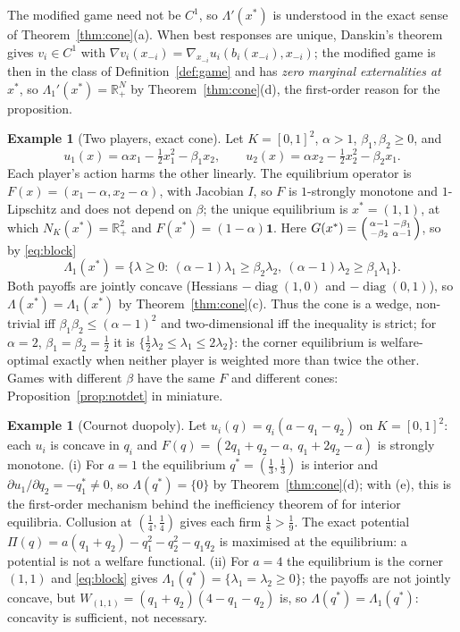 \documentclass[11pt,a4paper]{article}
\theoremstyle{plain}
\theoremstyle{definition}
\newtheorem{example}[theorem]{Example}
\theoremstyle{remark}
\newcommand{\R}{\mathbb{R}}
\newcommand{\NC}{N}
\newcommand{\Lam}{\Lambda}
\newcommand{\Lone}{\Lambda_{1}}
\begin{document}
The modified game need not be $C^1$, so $\Lam'(x^*)$ is understood in the exact sense of Theorem~\ref{thm:cone}(a). When best responses are unique, Danskin's theorem~\citep{danskin1966} gives $v_i\in C^1$ with $\nabla v_i(x_{-i})=\nabla_{x_{-i}}u_i(b_i(x_{-i}),x_{-i})$; the modified game is then in the class of Definition~\ref{def:game} and has \emph{zero marginal externalities at $x^*$}, so $\Lone'(x^*)=\R^N_+$ by Theorem~\ref{thm:cone}(d), the first-order reason for the proposition.

\begin{example}[Two players, exact cone]\label{ex:wedge}
Let $K=[0,1]^2$, $\alpha>1$, $\beta_1,\beta_2\ge 0$, and
\[
u_1(x)=\alpha x_1-\tfrac12x_1^2-\beta_1x_2,\qquad u_2(x)=\alpha x_2-\tfrac12x_2^2-\beta_2x_1 .
\]
Each player's action harms the other linearly. The equilibrium operator is $F(x)=(x_1-\alpha,x_2-\alpha)$, with Jacobian $I$, so $F$ is $1$-strongly monotone and $1$-Lipschitz and does not depend on $\beta$; the unique equilibrium is $x^*=(1,1)$, at which $\NC_K(x^*)=\R^2_+$ and $F(x^*)=(1-\alpha)\mathbf 1$. Here $G(x^*)=\begin{psmallmatrix}\alpha-1&-\beta_1\\-\beta_2&\alpha-1\end{psmallmatrix}$, so by \eqref{eq:block}
\[
\Lone(x^*)=\{\lambda\ge 0:\ (\alpha-1)\lambda_1\ge\beta_2\lambda_2,\ (\alpha-1)\lambda_2\ge\beta_1\lambda_1\}.
\]
Both payoffs are jointly concave (Hessians $-\operatorname{diag}(1,0)$ and $-\operatorname{diag}(0,1)$), so $\Lam(x^*)=\Lone(x^*)$ by Theorem~\ref{thm:cone}(c). Thus the cone is a wedge, non-trivial iff $\beta_1\beta_2\le(\alpha-1)^2$ and two-dimensional iff the inequality is strict; for $\alpha=2$, $\beta_1=\beta_2=\tfrac12$ it is $\{\tfrac12\lambda_2\le\lambda_1\le2\lambda_2\}$: the corner equilibrium is welfare-optimal exactly when neither player is weighted more than twice the other. Games with different $\beta$ have the same $F$ and different cones: Proposition~\ref{prop:notdet} in miniature.
\end{example}

\begin{example}[Cournot duopoly]\label{ex:cournot}
Let $u_i(q)=q_i(a-q_1-q_2)$ on $K=[0,1]^2$: each $u_i$ is concave in $q_i$ and $F(q)=(2q_1+q_2-a,\ q_1+2q_2-a)$ is strongly monotone. (i) For $a=1$ the equilibrium $q^*=(\tfrac13,\tfrac13)$ is interior and $\partial u_1/\partial q_2=-q_1^*\ne0$, so $\Lam(q^*)=\{0\}$ by Theorem~\ref{thm:cone}(d); with (e), this is the first-order mechanism behind the inefficiency theorem of \citet{dubey1986} for interior equilibria. Collusion at $(\tfrac14,\tfrac14)$ gives each firm $\tfrac18>\tfrac19$. The exact potential $\Pi(q)=a(q_1+q_2)-q_1^2-q_2^2-q_1q_2$ is maximised at the equilibrium: a potential is not a welfare functional. (ii) For $a=4$ the equilibrium is the corner $(1,1)$ and \eqref{eq:block} gives $\Lone(q^*)=\{\lambda_1=\lambda_2\ge0\}$; the payoffs are not jointly concave, but $W_{(1,1)}=(q_1+q_2)(4-q_1-q_2)$ is, so $\Lam(q^*)=\Lone(q^*)$: concavity is sufficient, not necessary.
\end{example}
\end{document}
